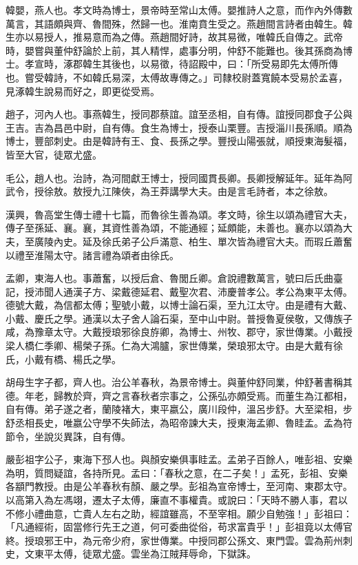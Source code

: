 \begin{pinyinscope}
韓嬰，燕人也。孝文時為博士，景帝時至常山太傅。嬰推詩人之意，而作內外傳數萬言，其語頗與齊、魯間殊，然歸一也。淮南賁生受之。燕趙間言詩者由韓生。韓生亦以易授人，推易意而為之傳。燕趙間好詩，故其易微，唯韓氏自傳之。武帝時，嬰嘗與董仲舒論於上前，其人精悍，處事分明，仲舒不能難也。後其孫商為博士。孝宣時，涿郡韓生其後也，以易徵，待詔殿中，曰：「所受易即先太傅所傳也。嘗受韓詩，不如韓氏易深，太傅故專傳之。」司隸校尉蓋寬饒本受易於孟喜，見涿韓生說易而好之，即更從受焉。

趙子，河內人也。事燕韓生，授同郡蔡誼。誼至丞相，自有傳。誼授同郡食子公與王吉。吉為昌邑中尉，自有傳。食生為博士，授泰山栗豐。吉授淄川長孫順。順為博士，豐部刺史。由是韓詩有王、食、長孫之學。豐授山陽張就，順授東海髮福，皆至大官，徒眾尤盛。

毛公，趙人也。治詩，為河間獻王博士，授同國貫長卿。長卿授解延年。延年為阿武令，授徐敖。敖授九江陳俠，為王莽講學大夫。由是言毛詩者，本之徐敖。

漢興，魯高堂生傳士禮十七篇，而魯徐生善為頌。孝文時，徐生以頌為禮官大夫，傳子至孫延、襄。襄，其資性善為頌，不能通經；延頗能，未善也。襄亦以頌為大夫，至廣陵內史。延及徐氏弟子公戶滿意、柏生、單次皆為禮官大夫。而瑕丘蕭奮以禮至淮陽太守。諸言禮為頌者由徐氏。

孟卿，東海人也。事蕭奮，以授后倉、魯閭丘卿。倉說禮數萬言，號曰后氏曲臺記，授沛聞人通漢子方、梁戴德延君、戴聖次君、沛慶普孝公。孝公為東平太傅。德號大戴，為信都太傅；聖號小戴，以博士論石渠，至九江太守。由是禮有大戴、小戴、慶氏之學。通漢以太子舍人論石渠，至中山中尉。普授魯夏侯敬，又傳族子咸，為豫章太守。大戴授琅邪徐良斿卿，為博士、州牧、郡守，家世傳業。小戴授梁人橋仁季卿、楊榮子孫。仁為大鴻臚，家世傳業，榮琅邪太守。由是大戴有徐氏，小戴有橋、楊氏之學。

胡母生字子都，齊人也。治公羊春秋，為景帝博士。與董仲舒同業，仲舒著書稱其德。年老，歸教於齊，齊之言春秋者宗事之，公孫弘亦頗受焉。而董生為江都相，自有傳。弟子遂之者，蘭陵褚大，東平嬴公，廣川段仲，溫呂步舒。大至梁相，步舒丞相長史，唯嬴公守學不失師法，為昭帝諫大夫，授東海孟卿、魯眭孟。孟為符節令，坐說災異誅，自有傳。

嚴彭祖字公子，東海下邳人也。與顏安樂俱事眭孟。孟弟子百餘人，唯彭祖、安樂為明，質問疑誼，各持所見。孟曰：「春秋之意，在二子矣！」孟死，彭祖、安樂各顓門教授。由是公羊春秋有顏、嚴之學。彭祖為宣帝博士，至河南、東郡太守。以高第入為左馮翊，遷太子太傅，廉直不事權貴。或說曰：「天時不勝人事，君以不修小禮曲意，亡貴人左右之助，經誼雖高，不至宰相。願少自勉強！」彭祖曰：「凡通經術，固當修行先王之道，何可委曲從俗，苟求富貴乎！」彭祖竟以太傅官終。授琅邪王中，為元帝少府，家世傳業。中授同郡公孫文、東門雲。雲為荊州刺史，文東平太傅，徒眾尤盛。雲坐為江賊拜辱命，下獄誅。


\end{pinyinscope}
